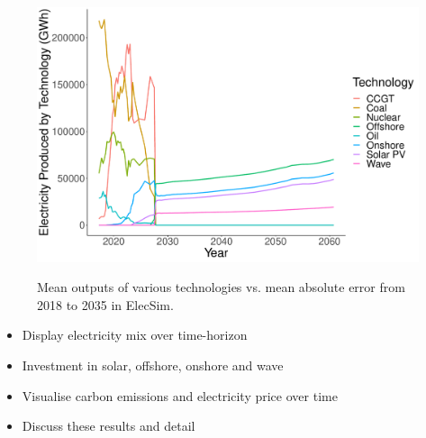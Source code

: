 \documentclass{article}
\begin{document}
\begin{figure}
\includegraphics[width=0.8\columnwidth]{figures/electricity_generated_plot.pdf}
\label{fig:electricity_generated_plot}
\caption{Mean outputs of various technologies vs. mean absolute error from 2018 to 2035 in ElecSim.}
\end{figure}

\begin{itemize}
	\item Display electricity mix over time-horizon
	\item Investment in solar, offshore, onshore and wave
	\item Visualise carbon emissions and electricity price over time
	\item Discuss these results and detail 
\end{itemize}





\end{document}
